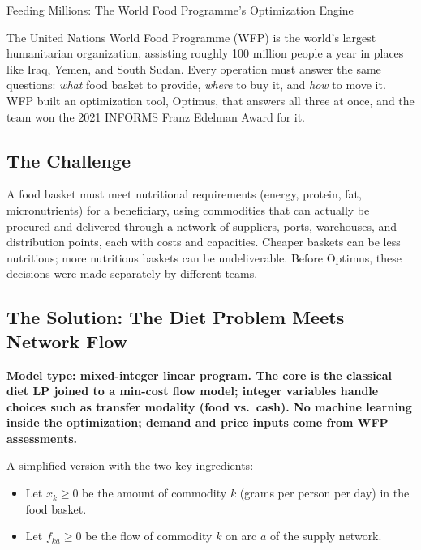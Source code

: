 \begin{casestudybox}{Feeding Millions: The World Food Programme's Optimization Engine}

The United Nations World Food Programme (WFP) is the world's largest humanitarian organization, assisting roughly 100 million people a year in places like Iraq, Yemen, and South Sudan.  Every operation must answer the same questions: \emph{what} food basket to provide, \emph{where} to buy it, and \emph{how} to move it.  WFP built an optimization tool, Optimus, that answers all three at once, and the team won the 2021 INFORMS Franz Edelman Award for it.

\subsection*{The Challenge}
A food basket must meet nutritional requirements (energy, protein, fat, micronutrients) for a beneficiary, using commodities that can actually be procured and delivered through a network of suppliers, ports, warehouses, and distribution points, each with costs and capacities.  Cheaper baskets can be less nutritious; more nutritious baskets can be undeliverable.  Before Optimus, these decisions were made separately by different teams.

\subsection*{The Solution: The Diet Problem Meets Network Flow}
\textbf{Model type: mixed-integer linear program.  The core is the classical diet LP joined to a min-cost flow model; integer variables handle choices such as transfer modality (food vs.\ cash).  No machine learning inside the optimization; demand and price inputs come from WFP assessments.}

A simplified version with the two key ingredients:

\begin{itemize}
\item Let $x_k \geq 0$ be the amount of commodity $k$ (grams per person per day) in the food basket.
\item Let $f_{ka} \geq 0$ be the flow of commodity $k$ on arc $a$ of the supply network.
\end{itemize}


\end{casestudybox}
